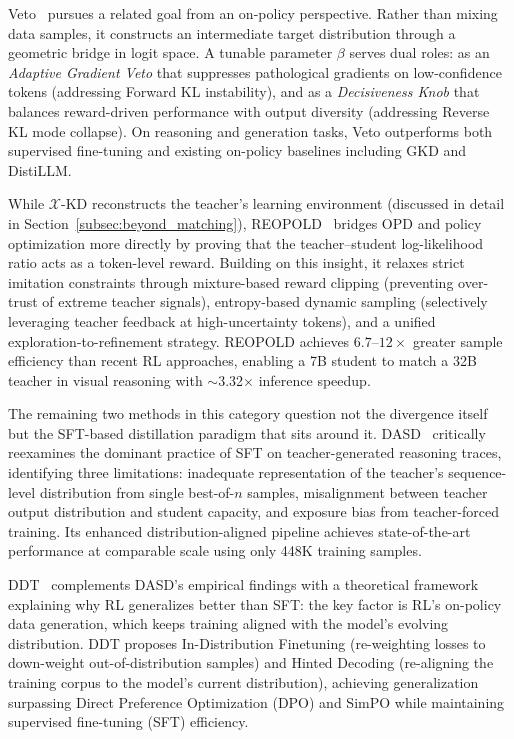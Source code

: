 \documentclass{article} %
\begin{document}
Veto~\citep{2601.07155} pursues a related goal from an on-policy perspective. Rather than mixing data samples, it constructs an intermediate target distribution through a geometric bridge in logit space. A tunable parameter $\beta$ serves dual roles: as an \emph{Adaptive Gradient Veto} that suppresses pathological gradients on low-confidence tokens (addressing Forward KL instability), and as a \emph{Decisiveness Knob} that balances reward-driven performance with output diversity (addressing Reverse KL mode collapse). On reasoning and generation tasks, Veto outperforms both supervised fine-tuning and existing on-policy baselines including GKD and DistiLLM.

While $\mathcal{X}$-KD reconstructs the teacher's learning environment (discussed in detail in Section~\ref{subsec:beyond_matching}), REOPOLD~\citep{2603.11137} bridges OPD and policy optimization more directly by proving that the teacher--student log-likelihood ratio acts as a token-level reward. Building on this insight, it relaxes strict imitation constraints through mixture-based reward clipping (preventing over-trust of extreme teacher signals), entropy-based dynamic sampling (selectively leveraging teacher feedback at high-uncertainty tokens), and a unified exploration-to-refinement strategy. REOPOLD achieves $6.7$--$12\times$ greater sample efficiency than recent RL approaches, enabling a 7B student to match a 32B teacher in visual reasoning with $\sim$3.32$\times$ inference speedup.


The remaining two methods in this category question not the divergence itself but the SFT-based distillation paradigm that sits around it. DASD~\citep{2601.09088} critically reexamines the dominant practice of SFT on teacher-generated reasoning traces, identifying three limitations: inadequate representation of the teacher's sequence-level distribution from single best-of-$n$ samples, misalignment between teacher output distribution and student capacity, and exposure bias from teacher-forced training. Its enhanced distribution-aligned pipeline achieves state-of-the-art performance at comparable scale using only 448K training samples.

DDT~\citep{2602.12222} complements DASD's empirical findings with a theoretical framework explaining why RL generalizes better than SFT: the key factor is RL's on-policy data generation, which keeps training aligned with the model's evolving distribution. DDT proposes In-Distribution Finetuning (re-weighting losses to down-weight out-of-distribution samples) and Hinted Decoding (re-aligning the training corpus to the model's current distribution), achieving generalization surpassing Direct Preference Optimization (DPO) and SimPO while maintaining supervised fine-tuning (SFT) efficiency.
\end{document}
